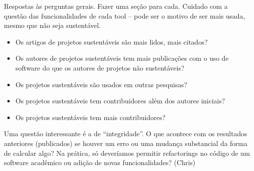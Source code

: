  \label{discussao}

Respostas às perguntas gerais. Fazer uma seção para cada.
Cuidado com a questão das funcionalidades de cada tool -- pode ser o motivo de ser mais usada,
mesmo que não seja sustentável.

\begin{itemize}
  \item Os artigos de projetos sustentáveis são mais lidos, mais citados?
  \item Os autores de projetos sustentáveis tem mais publicações com o uso de software do que os autores de projetos não sustentáveis?
  \item Os projetos sustentáveis são usados em outras pesquisas?
  \item Os projetos sustentáveis tem contribuidores além dos autores iniciais?
  \item Os projetos sustentáveis tem mais contribuidores?
\end{itemize}


Uma questão interessante é a de ``integridade''. O que acontece com os resultados anteriores (publicados)
se houver um erro ou uma mudança substancial da forma de calcular algo?
Na prática, só deveríamos permitir refactorings no código de um software acadêmico ou adição de novas funcionalidades?
(Chris)


